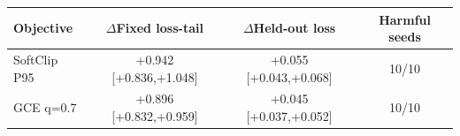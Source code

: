 \begin{tabular}{lccc}
\toprule
Objective & $\Delta$Fixed loss-tail & $\Delta$Held-out loss & Harmful seeds \\
\midrule
SoftClip P95 & +0.942 [+0.836,+1.048] & +0.055 [+0.043,+0.068] & 10/10 \\
GCE q=0.7 & +0.896 [+0.832,+0.959] & +0.045 [+0.037,+0.052] & 10/10 \\
\bottomrule
\end{tabular}

